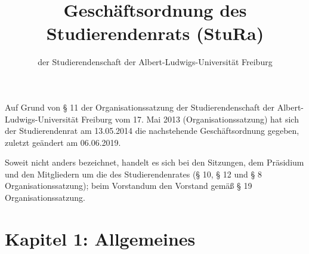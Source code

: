 \documentclass[fontsize=12pt,parskip=half, ref=short]{scrartcl}
\begin{document}
\subject{Lesefassung}
\title{Geschäftsordnung des Studierendenrats (StuRa)}
\subtitle{der Studierendenschaft der Albert-Ludwigs-Universität Freiburg}
\date{}
\maketitle

\pagebreak

\tableofcontents

\vspace*{\fill}

Auf Grund von § 11 der Organisationssatzung der Studierendenschaft der
Albert-Ludwigs-Universität Freiburg vom 17. Mai 2013 (Organisationssatzung) hat
sich der Studierendenrat am 13.05.2014 die nachstehende Geschäftsordnung
gegeben, zuletzt geändert am 06.06.2019.

Soweit nicht anders bezeichnet, handelt es sich bei den Sitzungen, dem Präsidium
und den Mitgliedern um die des Studierendenrates (§ 10, § 12 und § 8 Organisationssatzung); beim Vorstandum den Vorstand gemäß § 19 Organisationssatzung.

\pagebreak


\section*{ Kapitel 1: Allgemeines }
\end{document}
